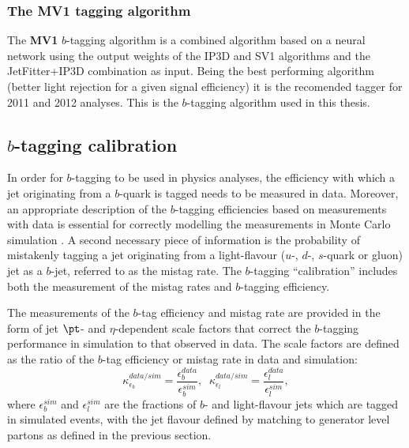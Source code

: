 

\subsubsection{The MV1 tagging algorithm}


The \textbf{MV1} $b$-tagging algorithm is a combined algorithm based on a neural network using the output weights of the IP3D and SV1 algorithms and the JetFitter+IP3D combination as input.  Being the best performing algorithm (better light rejection for a given signal efficiency) it is the recomended tagger for 2011 and 2012 analyses. This is the $b$-tagging algorithm used in this thesis.


\subsection{$b$-tagging calibration}


In order for $b$-tagging to be used in physics analyses, the efficiency with which a jet originating from a $b$-quark is tagged needs to be measured in data.  Moreover, an appropriate description of the $b$-tagging efficiencies based on measurements with data is essential for correctly modelling the measurements in Monte Carlo simulation . A second necessary piece of information is the probability of mistakenly tagging a jet originating from a light-flavour ($u$-, $d$-, $s$-quark or gluon) jet as a $b$-jet, referred to as the mistag rate. The $b$-tagging ``calibration'' includes both the measurement of the mistag rates and $b$-tagging efficiency.


The measurements of the $b$-tag efficiency and mistag rate are provided in the form of jet $\pt$- and $\eta$-dependent scale factors that correct the $b$-tagging performance in simulation to that observed in data.  The scale factors are defined as the ratio of the $b$-tag efficiency or mistag rate in data and simulation:
%
\begin{equation}
\kappa_{\epsilon_b}^{data/sim}  = \frac{\epsilon_b^{data}}{\epsilon_b^{sim}}, \; \;   \kappa_{\epsilon_l}^{data/sim}  = \frac{\epsilon_l^{data}}{\epsilon_l^{sim}},
\end{equation}
%
where $\epsilon_b^{sim}$ and $\epsilon_l^{sim}$ are the fractions of $b$- and light-flavour jets which are tagged in simulated events, %
 with the jet flavour defined by matching to generator level partons as defined in the previous section. %

